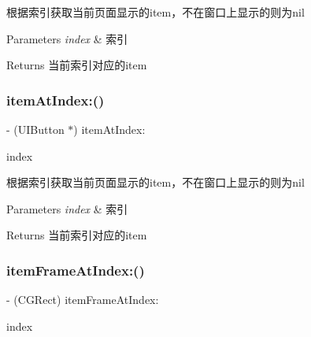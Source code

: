 根据索引获取当前页面显示的item，不在窗口上显示的则为nil


\begin{DoxyParams}{Parameters}
{\em index} & 索引\\
\hline
\end{DoxyParams}
\begin{DoxyReturn}{Returns}
当前索引对应的item 
\end{DoxyReturn}
\mbox{\label{interface_v_t_menu_bar_a99f0f75a9516d06886df6c33e487b6e4}} 
\subsubsection{\texorpdfstring{item\+At\+Index\+:()}{itemAtIndex:()}\hspace{0.1cm}{\footnotesize\ttfamily [3/3]}}
{\footnotesize\ttfamily -\/ (U\+I\+Button $\ast$) item\+At\+Index\+: \begin{DoxyParamCaption}\item[{(N\+S\+U\+Integer)}]{index }\end{DoxyParamCaption}}

根据索引获取当前页面显示的item，不在窗口上显示的则为nil


\begin{DoxyParams}{Parameters}
{\em index} & 索引\\
\hline
\end{DoxyParams}
\begin{DoxyReturn}{Returns}
当前索引对应的item 
\end{DoxyReturn}
\mbox{\label{interface_v_t_menu_bar_ab9b968d5635a07a921bea02b7ea019c3}} 
\subsubsection{\texorpdfstring{item\+Frame\+At\+Index\+:()}{itemFrameAtIndex:()}\hspace{0.1cm}{\footnotesize\ttfamily [1/3]}}
{\footnotesize\ttfamily -\/ (C\+G\+Rect) item\+Frame\+At\+Index\+: \begin{DoxyParamCaption}\item[{(N\+S\+U\+Integer)}]{index }\end{DoxyParamCaption}}

